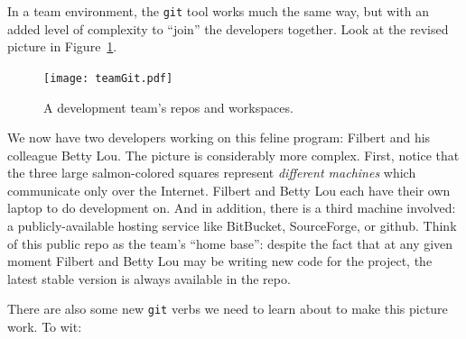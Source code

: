 In a team environment, the \texttt{git} tool works much the same way, but with
an added level of complexity to ``join'' the developers together. Look at the
revised picture in Figure~\ref{fig:teamGit}.

\begin{figure}
\centering
\texttt{[image: teamGit.pdf]}  %
\caption{A development team's repos and workspaces.}
\label{fig:teamGit}
\end{figure}

We now have two developers working on this feline program: Filbert and his
colleague Betty Lou. The picture is considerably more complex. First, notice
that the three large salmon-colored squares represent \textit{different machines}
which communicate only over the Internet. Filbert and Betty Lou each have
their own laptop to do development on. And in addition, there is a third
machine involved: a publicly-available hosting service like BitBucket,
SourceForge, or github. Think of this public repo as the team's ``home base'':
despite the fact that at any given moment Filbert and Betty Lou may be writing
new code for the project, the latest stable version is always available in the
repo.

There are also some new \texttt{git} verbs we need to learn about to make this
picture work. To wit:

